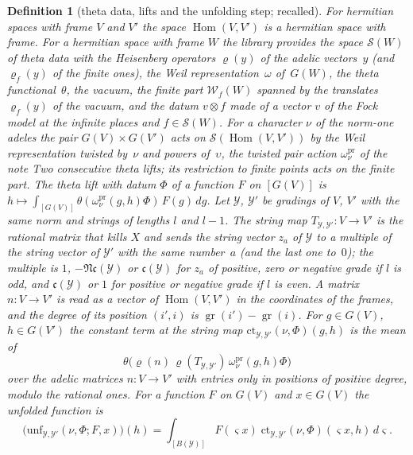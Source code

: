 \documentclass[11pt,a4paper]{article}
\newcommand{\Hom}{\operatorname{Hom}}
\newcommand{\m}[1]{\mbox{$#1$}}        %
\theoremstyle{plainx}
\theoremstyle{uprightx}
\newtheorem{definition}[theorem]{Definition}
\newcommand{\gr}{\operatorname{gr}}
\newcommand{\tensor}{\otimes}
\newcommand{\Bes}[1]{B(#1)}                        %
\newcommand{\cst}[1]{\mathfrak{c}(#1)}             %
\newcommand{\Tm}[2]{T_{#1,#2}}                      %
\newcommand{\pW}[1]{\omega^{\mathrm{pr}}_{#1}}      %
\begin{document}
\begin{definition}[theta data, lifts and the unfolding step; recalled]\label{d:theta}
For hermitian spaces with frame $V$ and $V'$ the space \m{\Hom(V,V')} is a hermitian space with frame. For a
hermitian space with frame $W$ the library provides the space $\mathcal{S}(W)$ of theta data with the Heisenberg
operators \m{\varrho(y)} of the adelic vectors~$y$ (and \m{\varrho_f(y)} of the finite ones), the Weil
representation~$\omega$ of~$G(W)$, the theta functional~$\theta$, the vacuum, the \emph{finite part}
$\mathcal{W}_f(W)$ spanned by the translates \m{\varrho_f(y)} of the vacuum, and the datum $v\tensor f$ made
of a vector $v$ of the Fock model at the infinite places and $f\in\mathcal{S}(W)$. For a character $\nu$ of the
norm-one adeles the pair \m{G(V)\times G(V')} acts on $\mathcal{S}(\Hom(V,V'))$ by the Weil representation
twisted by~$\nu$ and powers of~$\upsilon$, the \emph{twisted pair action} $\pW{\nu}$ of the note \emph{Two
consecutive theta lifts}; its restriction to finite points acts on the finite part. The \emph{theta lift} with
datum $\Phi$ of a function $F$ on $[G(V)]$ is
$h\mapsto\int_{[G(V)]}\theta(\pW{\nu}(g,h)\Phi)\,F(g)\,dg$. Let $\mathcal{Y}$, $\mathcal{Y}'$ be gradings of
$V$, $V'$ with the same norm and strings of lengths $l$ and \m{l-1}. The \emph{string map}
$\Tm{\mathcal{Y}}{\mathcal{Y}'}\colon V\to V'$ is the rational matrix that kills $X$ and sends the string vector
$z_a$ of $\mathcal{Y}$ to a multiple of the string vector of $\mathcal{Y}'$ with the same number~$a$ (and the last
one to~$0$); the multiple is $1$, \m{-\mathfrak{N}\cst{\mathcal{Y}}} or $\cst{\mathcal{Y}}$ for $z_a$ of positive, zero or
negative grade if $l$ is odd, and $\cst{\mathcal{Y}}$ or $1$ for positive or negative grade if $l$ is even. A
matrix \m{n\colon V\to V'} is read as a vector of \m{\Hom(V,V')} in the coordinates of the frames, and the
\emph{degree} of its position $(i',i)$ is \m{\gr(i')-\gr(i)}. For \m{g\in G(V)}, \m{h\in G(V')} the \emph{constant
term at the string map} $\mathrm{ct}_{\mathcal{Y},\mathcal{Y}'}(\nu,\Phi)(g,h)$ is the mean of
\[\theta\bigl(\varrho(n)\,\varrho(\Tm{\mathcal{Y}}{\mathcal{Y}'})\,\pW{\nu}(g,h)\Phi\bigr)\]
over the adelic matrices \m{n\colon V\to V'} with entries only in positions of positive degree, modulo the
rational ones. For a function $F$ on $G(V)$ and \m{x\in G(V)} the \emph{unfolded function} is
\[\bigl(\mathrm{unf}_{\mathcal{Y},\mathcal{Y}'}(\nu,\Phi;F,x)\bigr)(h)=\int_{[\Bes{\mathcal{Y}}]}F(\varsigma x)\;
\mathrm{ct}_{\mathcal{Y},\mathcal{Y}'}(\nu,\Phi)(\varsigma x,h)\,d\varsigma .\]
\end{definition}
\end{document}
